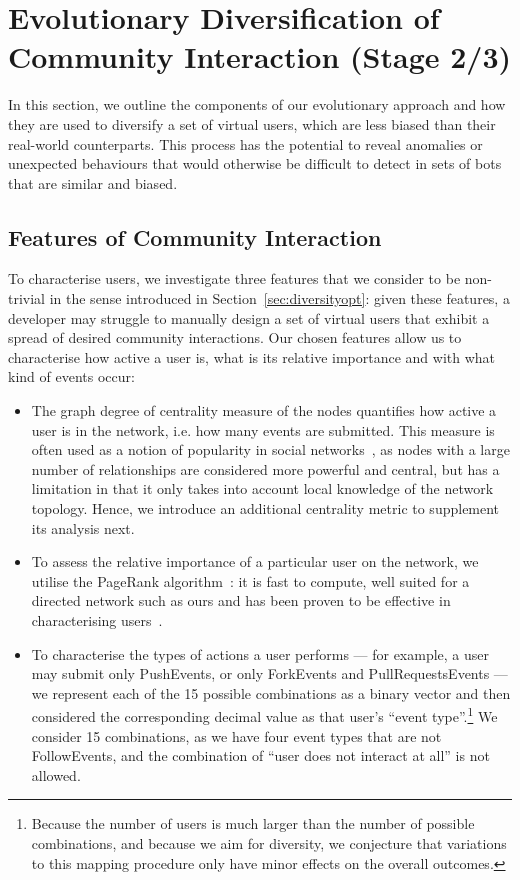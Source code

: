 \documentclass[dvipsnames,format=sigconf,anonymous=False,review=false, balance=false]{acmart}
\begin{document}
\section{Evolutionary Diversification of Community Interaction (Stage 2/3)}

In this section, we outline the components of our evolutionary approach and how they are used to diversify a set of virtual users, which are less biased than their real-world counterparts. This process has the potential to reveal anomalies or unexpected behaviours that would otherwise be difficult to detect in sets of bots that are similar and biased.

\subsection{Features of Community Interaction}

To characterise users, we investigate three features that we consider to be non-trivial in the sense introduced in Section~\ref{sec:diversityopt}: given these features, a developer may struggle to manually design a set of virtual users that exhibit a spread of desired community interactions. 
Our chosen features allow us to characterise how active a user is, what is its relative importance and with what kind of events occur: 
\begin{itemize}
\item The graph degree of centrality measure of the nodes quantifies how active a user is in the network, i.e. how many events are submitted. This measure is often used as a notion of popularity in social networks~\cite{https://doi.org/10.48550/arxiv.2011.01627}, as nodes with a large number of relationships are considered more powerful and central, but has a limitation in that it only takes into account local knowledge of the network topology. Hence, we introduce an additional centrality metric to supplement its analysis next. 
\item To assess the relative importance of a particular user on the network, we utilise the PageRank algorithm~\cite{page1999pagerank}: it is fast to compute, well suited for a directed network such as ours and has been proven to be effective in characterising users~\cite{9420317}.
\item To characterise the types of actions a user performs --- for example, a user may submit only PushEvents, or only ForkEvents and PullRequestsEvents --- we represent each of the 15 possible combinations as a binary vector and then considered the corresponding decimal value as that user's ``event type''.\footnote{Because the number of users is much larger than the number of possible combinations, and because we aim for diversity, we conjecture that variations to this mapping procedure only have minor effects on the overall outcomes.} We consider 15 combinations, as we have four event types that are not FollowEvents, and the combination of ``user does not interact at all'' is not allowed.
\end{itemize}
\end{document}
